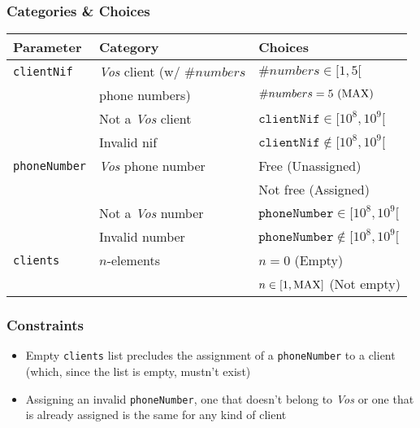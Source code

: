 \subsubsection{Categories \& Choices}
\label{sec:methods.assignPhoneNumber.choices}
\begin{table}[!hbtp]
  \centering
  \normalsize
  \begin{tabular}{|l|l|l|}
    \hline
    \textbf{Parameter} & \textbf{Category} & \textbf{Choices} \\ \hline
    \texttt{clientNif}
    & \textit{Vos} client (w/ $\#numbers$
      & $\#numbers \in [1,5[$     \\ \cline{3-3}
    & phone numbers)
      & $\#numbers = 5\ (\rm{MAX})$ \\ \cline{2-3}
    & Not a \textit{Vos} client
      & $\texttt{clientNif} \in [10^8,10^9[$ \\ \cline{2-3}
    & Invalid nif
      & $\texttt{clientNif} \notin [10^8,10^9[$ \\ \hline
    \texttt{phoneNumber}
    & \textit{Vos} phone number
      & Free (Unassigned)   \\ \cline{3-3}
    & & Not free (Assigned) \\ \cline{2-3}
    & Not a \textit{Vos} number
      & $\texttt{phoneNumber} \in [10^8,10^9[$\\ \cline{2-3}
    & Invalid number
      & $\texttt{phoneNumber} \notin [10^8,10^9[$ \\ \hline
    \texttt{clients}
    & $n$-elements
      & $n = 0$ (Empty)                  \\ \cline{3-3}
    & & $n \in [1,\rm{MAX}]$ (Not empty) \\ \hline
  \end{tabular}
\end{table}

\subsubsection{Constraints}
\label{sec:methods.assignPhoneNumber.constraints}
\begin{itemize}
  \item Empty \texttt{clients} list precludes the assignment of a
        \texttt{phoneNumber} to a client (which, since the list is empty,
        mustn't exist)
  \item Assigning an invalid \texttt{phoneNumber}, one that doesn't belong to
        \textit{Vos} or one that is already assigned is the same for any kind of
        client
\end{itemize}

